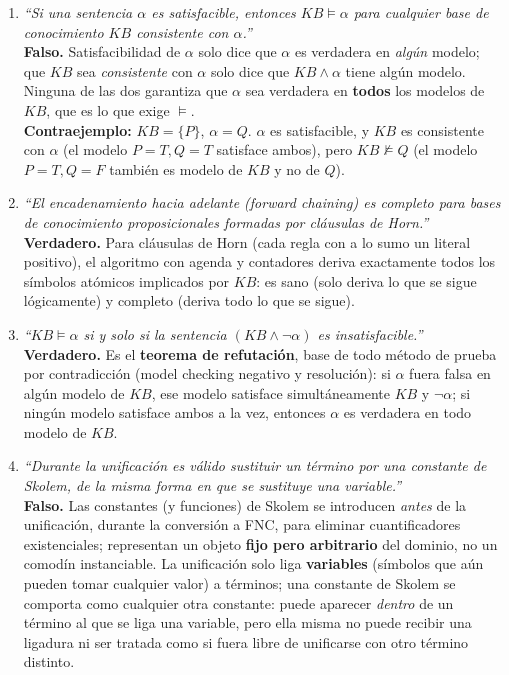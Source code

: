 \begin{enumerate}
    \item[a.] \textit{``Si una sentencia $\alpha$ es satisfacible, entonces $KB \models \alpha$ para
    cualquier base de conocimiento $KB$ consistente con $\alpha$.''}\\
    \textbf{Falso.} Satisfacibilidad de $\alpha$ solo dice que $\alpha$ es verdadera en \emph{algún}
    modelo; que $KB$ sea \emph{consistente} con $\alpha$ solo dice que $KB \land \alpha$ tiene algún
    modelo. Ninguna de las dos garantiza que $\alpha$ sea verdadera en \textbf{todos} los modelos de
    $KB$, que es lo que exige $\models$.\\
    \textbf{Contraejemplo:} $KB = \{P\}$, $\alpha = Q$. $\alpha$ es satisfacible, y $KB$ es
    consistente con $\alpha$ (el modelo $P{=}T, Q{=}T$ satisface ambos), pero $KB \not\models Q$
    (el modelo $P{=}T, Q{=}F$ también es modelo de $KB$ y no de $Q$).

    \item[b.] \textit{``El encadenamiento hacia adelante (forward chaining) es completo para bases de
    conocimiento proposicionales formadas por cláusulas de Horn.''}\\
    \textbf{Verdadero.} Para cláusulas de Horn (cada regla con a lo sumo un literal positivo), el
    algoritmo con agenda y contadores deriva exactamente todos los símbolos atómicos implicados por
    $KB$: es sano (solo deriva lo que se sigue lógicamente) y completo (deriva todo lo que se sigue).

    \item[c.] \textit{``$KB \models \alpha$ si y solo si la sentencia $(KB \land \neg\alpha)$ es
    insatisfacible.''}\\
    \textbf{Verdadero.} Es el \textbf{teorema de refutación}, base de todo método de prueba por
    contradicción (model checking negativo y resolución): si $\alpha$ fuera falsa en algún modelo de
    $KB$, ese modelo satisface simultáneamente $KB$ y $\neg\alpha$; si ningún modelo satisface ambos a
    la vez, entonces $\alpha$ es verdadera en todo modelo de $KB$.

    \item[d.] \textit{``Durante la unificación es válido sustituir un término por una constante de
    Skolem, de la misma forma en que se sustituye una variable.''}\\
    \textbf{Falso.} Las constantes (y funciones) de Skolem se introducen \emph{antes} de la
    unificación, durante la conversión a FNC, para eliminar cuantificadores existenciales; representan
    un objeto \textbf{fijo pero arbitrario} del dominio, no un comodín instanciable. La unificación
    solo liga \textbf{variables} (símbolos que aún pueden tomar cualquier valor) a términos; una
    constante de Skolem se comporta como cualquier otra constante: puede aparecer \emph{dentro} de un
    término al que se liga una variable, pero ella misma no puede recibir una ligadura ni ser tratada
    como si fuera libre de unificarse con otro término distinto.
\end{enumerate}

